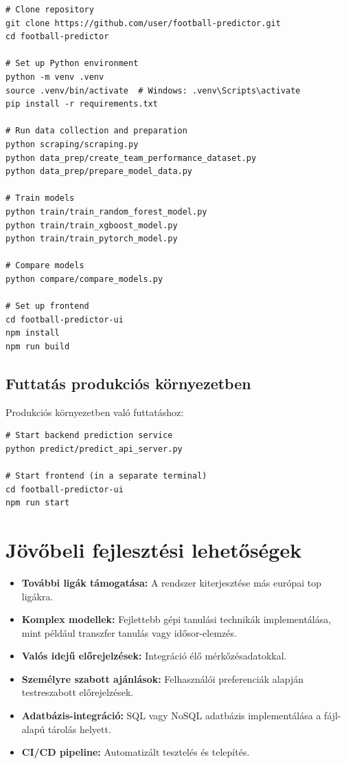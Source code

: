 \begin{verbatim}
# Clone repository
git clone https://github.com/user/football-predictor.git
cd football-predictor

# Set up Python environment
python -m venv .venv
source .venv/bin/activate  # Windows: .venv\Scripts\activate
pip install -r requirements.txt

# Run data collection and preparation
python scraping/scraping.py
python data_prep/create_team_performance_dataset.py
python data_prep/prepare_model_data.py

# Train models
python train/train_random_forest_model.py
python train/train_xgboost_model.py
python train/train_pytorch_model.py

# Compare models
python compare/compare_models.py

# Set up frontend
cd football-predictor-ui
npm install
npm run build
\end{verbatim}

\subsection{Futtatás produkciós környezetben}

Produkciós környezetben való futtatáshoz:

\begin{verbatim}
# Start backend prediction service
python predict/predict_api_server.py

# Start frontend (in a separate terminal)
cd football-predictor-ui
npm run start
\end{verbatim}

\section{Jövőbeli fejlesztési lehetőségek}

\begin{itemize}
    \item \textbf{További ligák támogatása:} A rendszer kiterjesztése más európai top ligákra.
    \item \textbf{Komplex modellek:} Fejlettebb gépi tanulási technikák implementálása, mint például transzfer tanulás vagy idősor-elemzés.
    \item \textbf{Valós idejű előrejelzések:} Integráció élő mérkőzésadatokkal.
    \item \textbf{Személyre szabott ajánlások:} Felhasználói preferenciák alapján testreszabott előrejelzések.
    \item \textbf{Adatbázis-integráció:} SQL vagy NoSQL adatbázis implementálása a fájl-alapú tárolás helyett.
    \item \textbf{CI/CD pipeline:} Automatizált tesztelés és telepítés.
\end{itemize}

